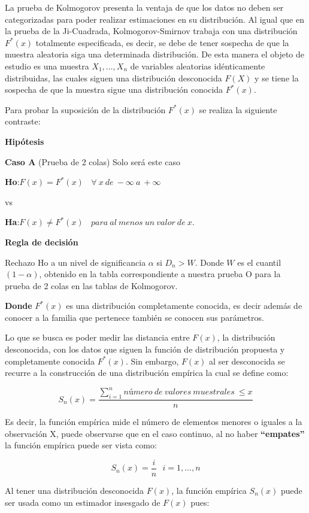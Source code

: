\documentclass[a4paper,oneside,openany]{book}
\begin{document}
La prueba de Kolmogorov presenta la ventaja de que los datos no deben
ser categorizadas para poder realizar estimaciones en su distribución.
Al igual que en la prueba de la Ji-Cuadrada, Kolmogorov-Smirnov trabaja
con una distribución \(F^*(x)\) totalmente especificada, es decir, se
debe de tener sospecha de que la muestra aleatoria siga una determinada
distribución. De esta manera el objeto de estudio es una muestra
\(X_{1},\ldots,X_{n}\) de variables aleatorias idénticamente
distribuidas, las cuales siguen una distribución desconocida \(F(X)\) y
se tiene la sospecha de que la muestra sigue una distribución conocida
\(F^*(x)\).

Para probar la suposición de la distribución \(F^*(x)\) se realiza la
siguiente contraste:

\textbf{Hipótesis}

\textbf{Caso A} (Prueba de 2 colas) Solo será este caso

\textbf{Ho}:\(F(x)=F^*(x) \ \ \ \ \forall\ x\  de\ -\infty \ a\  +\infty\)

vs

\textbf{Ha}:\(F(x) \neq F^*(x) \ \ \ \ para\ al\ menos\ un\  valor\ de\  x.\)

\textbf{Regla de decisión}

Rechazo Ho a un nivel de significancia \(\alpha\) si \(D_{n}>W\). Donde
\(W\) es el cuantil \((1-\alpha)\), obtenido en la tabla correspondiente
a nuestra prueba O para la prueba de 2 colas en las tablas de
Kolmogorov.

\textbf{Donde} \(F^*(x)\) es una distribución completamente conocida, es
decir además de conocer a la familia que pertenece también se conocen
sus parámetros.

Lo que se busca es poder medir las distancia entre \(F(x)\), la
distribución desconocida, con los datos que siguen la función de
distribución propuesta y completamente conocida \(F^*(x)\). Sin embargo,
\(F(x)\) al ser desconocida se recurre a la construcción de una
distribución empírica la cual se define como:

\[S_{n}(x)=\frac{ \sum_{i=1}^{n}número\ de\ valores\ muestrales\ \leq x}{n}\]

Es decir, la función empírica mide el número de elementos menores o
iguales a la observación X, puede observarse que en el caso continuo, al
no haber \textbf{``empates''} la función empírica puede ser vista como:

\[S_{n}(x)=\frac{i}{n} \ \ \ i=1,\ldots,n\]

Al tener una distribución desconocida \(F(x)\), la función empírica
\(S_{n}(x)\) puede ser usada como un estimador insesgado de \(F(x)\)
pues:
\end{document}
